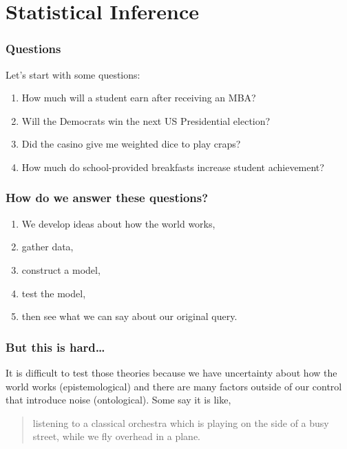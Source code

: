 \documentclass{beamer}
\begin{document}
\section{Statistical Inference}

\begin{frame}
\frametitle{Questions}

Let's start with some questions: 
\begin{enumerate}
	\item How much will a student earn after receiving an MBA?
	\item Will the Democrats win the next US Presidential election? 
	\item Did the casino give me weighted dice to play craps? 
	\item How much do school-provided breakfasts increase student achievement?
\end{enumerate}

\end{frame}

\begin{frame}
\frametitle{How do we answer these questions? }

\begin{enumerate}
	\item We develop ideas about how the world works, 
	\item gather data, 
	\item construct a model, 
	\item test the model, 
	\item then see what we can say about our original query. 
\end{enumerate}

\end{frame}
	

\begin{frame}
\frametitle{But this is hard\ldots}

It is difficult to test those theories because we have uncertainty about how the world works (epistemological) and there are many factors outside of our control that introduce noise (ontological). Some say it is like, 
\begin{quote}
listening to a classical orchestra which is playing on the side of a busy street, while we fly overhead in a plane.
\end{quote}

\end{frame}
\end{document}
